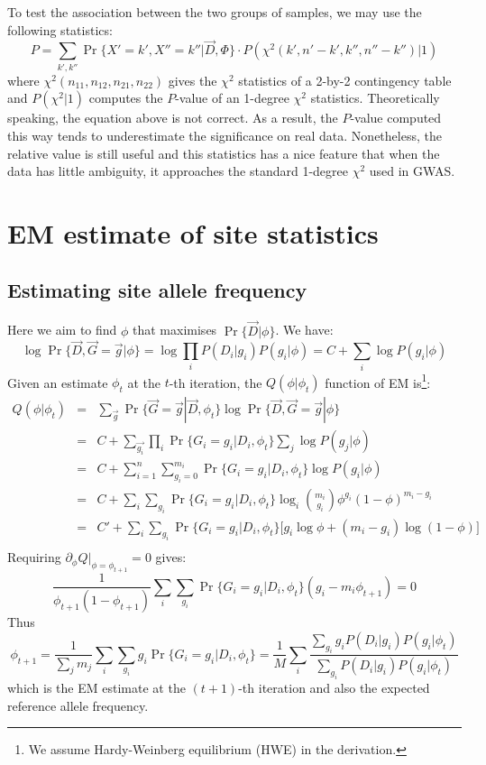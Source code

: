 \documentclass[pdftex,10pt]{book}
\begin{document}
To test the association between the two groups of samples, we may use
the following statistics:
\[
P=\sum_{k',k''}\Pr\{X'=k',X''=k''|\vec{D},\Phi\}\cdot P(\chi^2(k',n'-k',k'',n''-k'')|1)
\]
where $\chi^2(n_{11},n_{12},n_{21},n_{22})$ gives the $\chi^2$ statistics of
a 2-by-2 contingency table and $P(\chi^2|1)$ computes the $P$-value of an 1-degree
$\chi^2$ statistics. Theoretically speaking, the equation above is not correct.
As a result, the $P$-value computed this way tends to underestimate the significance
on real data. Nonetheless, the relative value is still useful and this statistics
has a nice feature that when the data has little ambiguity, it approaches
the standard 1-degree $\chi^2$ used in GWAS.



\section{EM estimate of site statistics}

\subsection{Estimating site allele frequency}
Here we aim to find $\phi$ that maximises $\Pr\{\vec{D}|\phi\}$. We have:
$$\log \Pr\{\vec{D},\vec{G}=\vec{g}|\phi\}=\log\prod_iP(D_i|g_i)P(g_i|\phi)=C+\sum_i\log P(g_i|\phi)$$
Given an estimate $\phi_t$ at the $t$-th iteration, the $Q(\phi|\phi_t)$
function of EM is\footnote{We assume Hardy-Weinberg equilibrium (HWE) in the
  derivation.}:
\begin{eqnarray*}
  Q(\phi|\phi_t)&=&\sum_{\vec{g}}\Pr\{\vec{G}=\vec{g}|\vec{D},\phi_t\}\log \Pr\{\vec{D},\vec{G}=\vec{g}|\phi\}\\
  &=&C+\sum_{\vec{g_i}}\prod_i\Pr\{G_i=g_i|D_i,\phi_t\}\sum_j\log P(g_j|\phi)\\
  &=&C+\sum_{i=1}^n\sum_{g_i=0}^{m_i}\Pr\{G_i=g_i|D_i,\phi_t\}\log P(g_i|\phi)\\
  &=&C+\sum_i\sum_{g_i}\Pr\{G_i=g_i|D_i,\phi_t\}\log_i \binom{m_i}{g_i}\phi^{g_i}(1-\phi)^{m_i-g_i}\\
  &=&C'+\sum_i\sum_{g_i}\Pr\{G_i=g_i|D_i,\phi_t\}\Big[g_i\log\phi+(m_i-g_i)\log(1-\phi)\Big]\\
\end{eqnarray*}
Requiring $\partial_{\phi}Q\Big|_{\phi=\phi_{t+1}}=0$ gives:
$$\frac{1}{\phi_{t+1}(1-\phi_{t+1})}\sum_i\sum_{g_i}\Pr\{G_i=g_i|D_i,\phi_t\}(g_i-m_i\phi_{t+1})=0$$
Thus
\begin{equation}\label{equ:freq1}
\phi_{t+1}=\frac{1}{\sum_jm_j}\sum_i\sum_{g_i}g_i\Pr\{G_i=g_i|D_i,\phi_t\}
=\frac{1}{M}\sum_i\frac{\sum_{g_i}g_iP(D_i|g_i)P(g_i|\phi_t)}{\sum_{g_i}P(D_i|g_i)P(g_i|\phi_t)}
\end{equation}
which is the EM estimate at the $(t+1)$-th iteration and also the
expected reference allele frequency.
\end{document}
